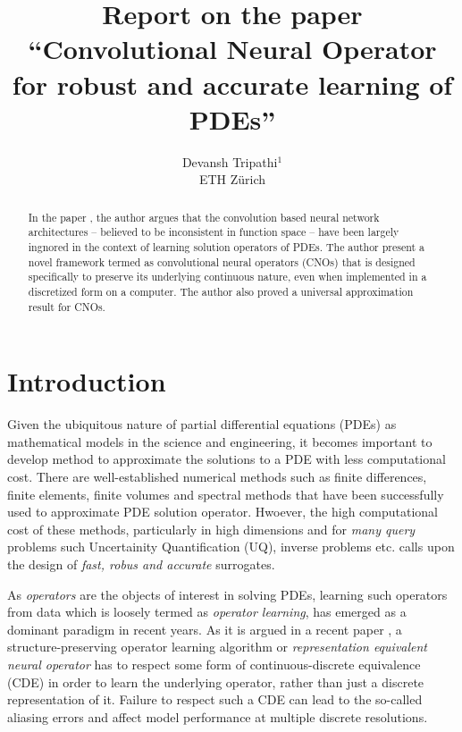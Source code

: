 \documentclass[reqno,9pt]{amsart}
\title{Report on the paper ``Convolutional Neural Operator for robust and accurate learning of PDEs''}
\author{Devansh Tripathi$^1$ \\ ETH Z\lowercase{\"urich}}
\theoremstyle{plain}
\theoremstyle{definition}
\begin{document}

\begin{abstract}
    In the paper \cite{BR2023}, the author argues that the convolution based neural network architectures -- believed to be inconsistent in function space -- have been largely ingnored in the context of learning solution operators of PDEs. The author present a novel framework termed as convolutional neural operators (CNOs) that is designed specifically to preserve its underlying continuous nature, even when implemented in a discretized form on a computer. The author also proved a universal approximation result for CNOs.
\end{abstract}
\maketitle
\section{\bf \large Introduction}
    Given the ubiquitous nature of partial differential equations (PDEs) as mathematical models in the science and engineering, it becomes important to develop method to approximate the solutions to a PDE with less computational cost. There are well-established numerical methods such as finite differences, finite elements, finite volumes and spectral methods that have been successfully used to approximate PDE solution operator. Hwoever, the high computational cost of these methods, particularly in high dimensions and for {\it many query} problems such Uncertainity Quantification (UQ), inverse problems etc. calls upon the design of {\it fast, robus and accurate} surrogates.

    \noindent As {\it operators} are the objects of interest in solving PDEs, learning such operators from data which is loosely termed as {\it operator learning}, has emerged as a dominant paradigm in recent years. As it is argued in a recent paper \cite{FB2023}, a structure-preserving operator learning algorithm or {\it representation equivalent neural operator} has to respect some form of continuous-discrete equivalence (CDE) in order to learn the underlying operator, rather than just a discrete representation of it. Failure to respect such a CDE can lead to the so-called aliasing errors \cite{FB2023} and affect model performance at multiple discrete resolutions.
\end{document}
